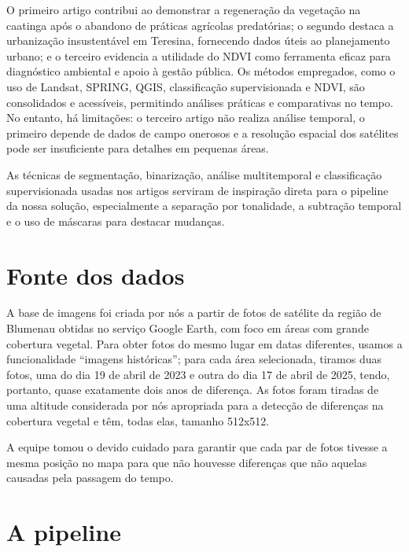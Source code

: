 \documentclass{article}
\begin{document}
O primeiro artigo contribui ao demonstrar a regeneração da vegetação na caatinga após o abandono de práticas agrícolas predatórias; o segundo destaca a urbanização insustentável em Teresina, fornecendo dados úteis ao planejamento urbano; e o terceiro evidencia a utilidade do NDVI como ferramenta eficaz para diagnóstico ambiental e apoio à gestão pública. Os métodos empregados, como o uso de Landsat, SPRING, QGIS, classificação supervisionada e NDVI, são consolidados e acessíveis, permitindo análises práticas e comparativas no tempo. No entanto, há limitações: o terceiro artigo não realiza análise temporal, o primeiro depende de dados de campo onerosos e a resolução espacial dos satélites pode ser insuficiente para detalhes em pequenas áreas.

As técnicas de segmentação, binarização, análise multitemporal e classificação supervisionada usadas nos artigos serviram de inspiração direta para o pipeline da nossa solução, especialmente a separação por tonalidade, a subtração temporal e o uso de máscaras para destacar mudanças.

\section{Fonte dos dados}

A base de imagens foi criada por nós a partir de fotos de satélite da região de Blumenau obtidas no serviço Google Earth, com foco em áreas com grande cobertura vegetal. Para obter fotos do mesmo lugar em datas diferentes, usamos a funcionalidade ``imagens históricas''; para cada área selecionada, tiramos duas fotos, uma do dia 19 de abril de 2023 e outra do dia 17 de abril de 2025, tendo, portanto, quase exatamente dois anos de diferença. As fotos foram tiradas de uma altitude considerada por nós apropriada para a detecção de diferenças na cobertura vegetal e têm, todas elas, tamanho 512x512.

A equipe tomou o devido cuidado para garantir que cada par de fotos tivesse a mesma posição no mapa para que não houvesse diferenças que não aquelas causadas pela passagem do tempo.

\section{A pipeline}
\end{document}
